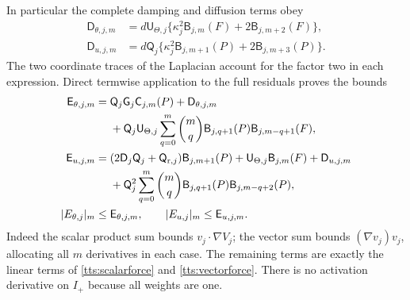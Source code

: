 In particular the complete damping and diffusion terms obey
\begin{align}\label{trls:diffusioncost}
 \mathsf D_{\theta,j,m}
 &=d\mathsf U_{\Theta,j}
   \{\mathsf\kappa_j^2\mathsf B_{j,m}(F)
                     +2\mathsf B_{j,m+2}(F)\},\nonumber\\
 \mathsf D_{u,j,m}
 &=d\mathsf Q_j
   \{\mathsf\kappa_j^2\mathsf B_{j,m+1}(P)
                     +2\mathsf B_{j,m+3}(P)\}.
\end{align}
The two coordinate traces of the Laplacian account for the factor
two in each expression. Direct termwise application to the full
residuals proves the bounds
\begin{align}\label{trls:forcecost}
 \mathsf E_{\theta,j,m}={}&
 \mathsf Q_j\mathsf G_j\mathsf C_{j,m}(P)
                     +\mathsf D_{\theta,j,m}\nonumber\\
 &+\mathsf Q_j\mathsf U_{\Theta,j}
    \sum_{q=0}^m\binom mq
       \mathsf B_{j,q+1}(P)\mathsf B_{j,m-q+1}(F),\nonumber\\
 \mathsf E_{u,j,m}={}&
 (2\mathsf D_j\mathsf Q_j+\mathsf Q_{{\rm r},j})
                  \mathsf B_{j,m+1}(P)
 +\mathsf U_{\Theta,j}\mathsf B_{j,m}(F)
 +\mathsf D_{u,j,m}\nonumber\\
 &+\mathsf Q_j^2\sum_{q=0}^m\binom mq
       \mathsf B_{j,q+1}(P)\mathsf B_{j,m-q+2}(P),\\
 |E_{\theta,j}|_m\leq{}&\mathsf E_{\theta,j,m},\qquad
 |E_{u,j}|_m\leq\mathsf E_{u,j,m}.\nonumber
\end{align}
Indeed the scalar product sum bounds
$v_j\cdot\nabla V_j$; the vector sum bounds
$(\nabla v_j)v_j$, allocating all $m$ derivatives in
each case. The remaining terms are exactly the linear terms of
\eqref{tts:scalarforce} and \eqref{tts:vectorforce}.
There is no activation derivative on $I_+$ because all weights
are one.

